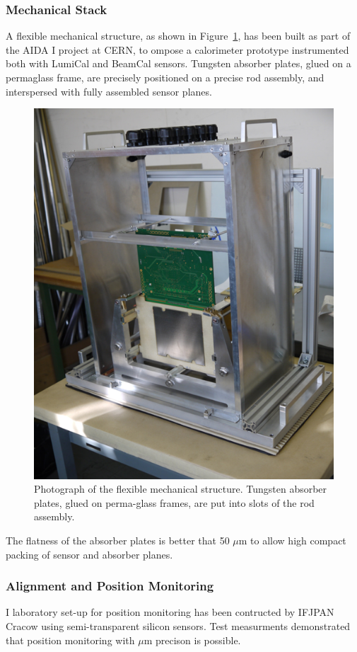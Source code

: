 \subsubsection{Mechanical Stack}

A flexible mechanical structure, as shown in  Figure~\ref{fig:mechanical_structure}, has been built as part of the AIDA I project at CERN,
to ompose a calorimeter prototype instrumented both with LumiCal and BeamCal sensors. Tungsten absorber plates, glued on a permaglass
frame, are precisely
positioned on a precise rod assembly, and interspersed with fully assembled sensor planes.
\begin{figure}[hbp]
\centering
\includegraphics[width=0.6\columnwidth,]{Calorimeter/FCAL/figs/mechanical_structure_2}
\caption{Photograph of the flexible mechanical structure. Tungsten absorber plates, glued on perma-glass frames, are put into slots of the
rod assembly.}
\label{fig:mechanical_structure}
\end{figure}
The flatness of the absorber plates is better that 50 $\mu$m to allow high compact packing of sensor and absorber planes.

\subsubsection{Alignment and Position Monitoring }

I laboratory set-up for position monitoring has been contructed by IFJPAN Cracow using semi-transparent
silicon sensors. Test measurments demonstrated that position monitoring with $\mu$m precison is possible.

